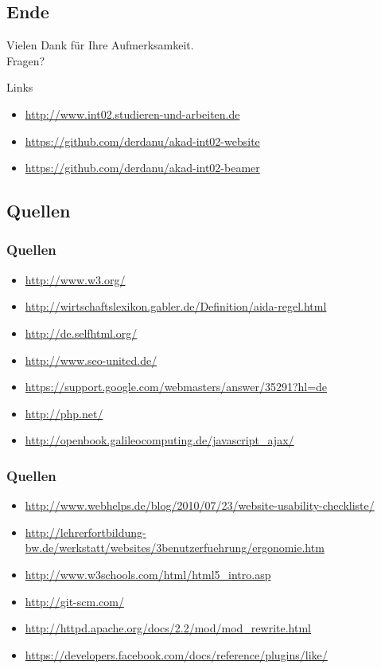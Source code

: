 \documentclass[xcolor=dvipsnames]{beamer}
\begin{document}
\subsection{Ende}
\begin{frame}
	\begin{block}{}	
		\begin{center}
			Vielen Dank für Ihre Aufmerksamkeit. \\
			Fragen?
		\end{center}	
	\end{block}
	\begin{block}{Links}	
		\begin{itemize}
			\item \url{http://www.int02.studieren-und-arbeiten.de}
			\item \url{https://github.com/derdanu/akad-int02-website}
			\item \url{https://github.com/derdanu/akad-int02-beamer}						
		\end{itemize}
	\end{block}
\end{frame}

\subsection{Quellen}
\begin{frame} %
  \frametitle{Quellen} %
 	\begin{itemize}
		\item \url{http://www.w3.org/}
		\item \url{http://wirtschaftslexikon.gabler.de/Definition/aida-regel.html}
		\item \url{http://de.selfhtml.org/}
		\item \url{http://www.seo-united.de/}
		\item \url{https://support.google.com/webmasters/answer/35291?hl=de}		\item \url{http://php.net/}
		\item \url{http://openbook.galileocomputing.de/javascript_ajax/}
	\end{itemize}
\end{frame}

\begin{frame} %
  \frametitle{Quellen} %
 	\begin{itemize}
 		\item  \url{http://www.webhelps.de/blog/2010/07/23/website-usability-checkliste/}
		\item \url{http://lehrerfortbildung-bw.de/werkstatt/websites/3benutzerfuehrung/ergonomie.htm}
		\item \url{ http://www.w3schools.com/html/html5_intro.asp}
		\item \url{http://git-scm.com/}
		\item \url{http://httpd.apache.org/docs/2.2/mod/mod_rewrite.html}
		\item \url{https://developers.facebook.com/docs/reference/plugins/like/}
	\end{itemize}
\end{frame}
\end{document}
